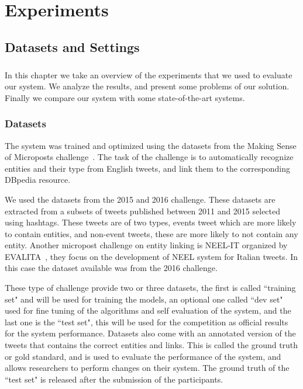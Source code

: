 
\chapter{Experiments}

\section{Datasets and Settings}
\paragraph{}
In this chapter we take an overview of the experiments that we used to evaluate our system. We analyze the results, and present some problems of our solution. Finally we compare our system with some state-of-the-art systems.


\subsection{Datasets}
The system was trained and optimized using the datasets from the Making Sense of Microposts challenge~\cite{rizzo2015making}. The task of the challenge is to automatically recognize entities and their type from English tweets, and link them to the corresponding DBpedia resource.  

We used the datasets from the 2015 and 2016 challenge. These datasets are extracted from a subsets of tweets published between 2011 and 2015 selected using hashtags. These tweets are of two types, events tweet which are more likely to contain entities, and non-event tweets, these are more likely to not contain any entity. 
Another micropost challenge on entity linking is NEEL-IT organized by EVALITA~\cite{basile2016evalita}, they focus on the development of NEEL system for Italian tweets. In this case the dataset available was from the 2016 challenge. 


These type of challenge provide two or three datasets, the first is called ``training set" and will be used for training the models, an optional one called ``dev set" used for fine tuning of the algorithms and self evaluation of the system, and the last one is the ``test set", this will be used for the competition as official results for the system performance. Datasets also come with an annotated version of the tweets that contains the correct entities and links. This is called the ground truth or gold standard, and is used to evaluate the performance of the system, and allows researchers to perform changes on their system. The ground truth of the ``test set" is released after the submission of the participants. 

